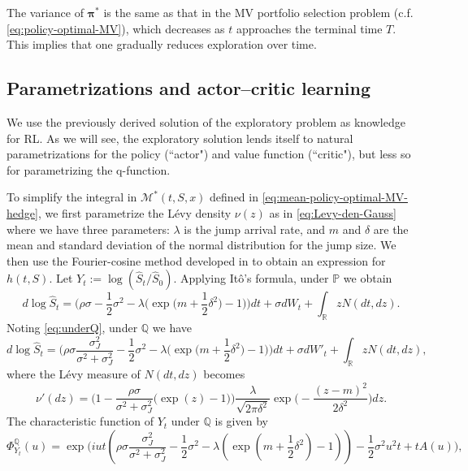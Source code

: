 \documentclass[11pt]{article}
\newcommand{\1}{\mathbbm{1}}
\newcommand{\bpi}{\boldsymbol{\pi}}
\begin{document}
The variance of $\bpi^*$ is the same as that in the MV portfolio selection problem (c.f. \eqref{eq:policy-optimal-MV}), which decreases as $t$ approaches the terminal time $T$. This implies that one gradually reduces exploration over time.

\subsection{Parametrizations and actor--critic learning}
We use the previously derived solution of the exploratory problem as knowledge for RL. As we will see, the exploratory solution lends itself to natural parametrizations for the policy (``actor") and value function (``critic"), but less so for parametrizing the q-function.

To simplify the integral in $\mathcal{M}^*(t,S,x)$  defined in \eqref{eq:mean-policy-optimal-MV-hedge}, we first parametrize the L\'evy density $\nu(z)$ as in \eqref{eq:Levy-den-Gauss} where we have three parameters:
$\lambda$ is the jump arrival rate, and $m$ and $\delta$ are the mean and standard deviation of the normal distribution for the jump size.
We then use the Fourier-cosine method developed in \cite{fang2009novel} to obtain an expression for $h(t,S)$. Let $Y_t:=\log(\hat{S}_t/\hat{S}_0)$. Applying It\^o's formula,  under $\mathbb{P}$ we obtain
\begin{equation}
	d\log \hat{S}_t = \bigg(\rho\sigma - \frac{1}{2}\sigma^2 - \lambda\bigg(\exp\bigg(m +\frac{1}{2}\delta^2\bigg)-1\bigg)\bigg) dt  + \sigma dW_t + \int_{\mathbb{R}}zN(dt,dz).
\end{equation}
Noting \eqref{eq:underQ}, under $\mathbb{Q}$ we have
\begin{equation}
	d\log \hat{S}_t = \bigg(\rho\sigma\frac{\sigma_J^2}{\sigma^2+\sigma_J^2} - \frac{1}{2}\sigma^2 - \lambda\bigg(\exp\bigg(m +\frac{1}{2}\delta^2\bigg)-1\bigg)\bigg)dt  + \sigma dW'_t + \int_{\mathbb{R}}zN(dt,dz),
\end{equation}
where the L\'evy measure of $N(dt,dz)$ becomes
\begin{equation}
	\nu'(dz)=\bigg(1-\frac{\rho\sigma}{\sigma^2+\sigma_J^2}\big(\exp(z)-1\big)\bigg)\frac{\lambda}{\sqrt{2\pi\delta^2}}\exp\bigg(-\frac{(z-m)^2}{2\delta^2}\bigg)dz.
\end{equation}
The characteristic function of $Y_t$ under $\mathbb{Q}$ is given by
\begin{equation}
	\Phi_{Y_t}^{\mathbb{Q}}(u) = \exp\bigg( iut\left(\rho\sigma\frac{\sigma_J^2}{\sigma^2+\sigma_J^2}- \frac{1}{2}\sigma^2 - \lambda\left(\exp\left(m +\frac{1}{2}\delta^2\right)-1\right)\right) - \frac{1}{2}\sigma^2u^2 t  + t A(u) \bigg),
\end{equation}
\end{document}
